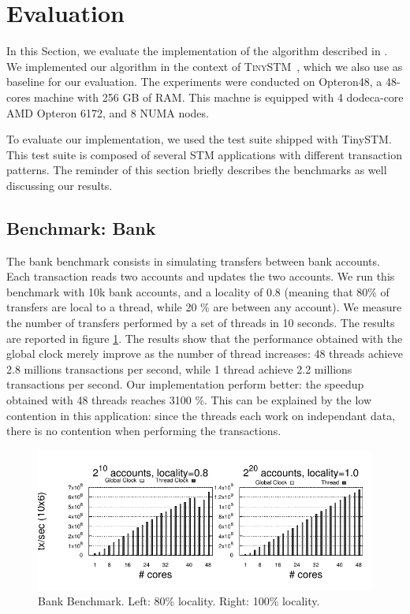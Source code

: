 \section{Evaluation}


In this Section, we evaluate the implementation of the algorithm
described in .  
We implemented our algorithm in the context of \textsc{TinySTM}~\cite{FelberFMR10}, which we also use as baseline for our evaluation. %
The experiments were conducted on Opteron48, a 48-cores machine with 256 GB of RAM. 
This machne is equipped with 4 dodeca-core AMD Opteron 6172, and 8 NUMA nodes.

To evaluate our implementation, we used the test suite shipped with TinySTM. 
This test suite is composed of several STM applications with different transaction patterns.
The reminder of this section briefly describes the benchmarks as well discussing our results.
 
\subsection{Benchmark: Bank}

The bank benchmark consists in simulating transfers between bank accounts. 
Each transaction reads two accounts and updates the two accounts. 
We run this benchmark with 10k bank accounts, and a locality
of 0.8 (meaning that 80\% of transfers are local to a thread, while 20
\% are between any account). 
We measure the number of transfers performed by a set of threads in 10 seconds.
The results are reported in figure \ref{fig:benchmarking:bank}.%
%
The results show that the performance obtained with the global clock
merely improve as the number of thread increases: 48 threads achieve 2.8
millions transactions per second, while 1 thread achieve 2.2 millions
transactions per second.
%
Our implementation perform better: the speedup obtained with 48
threads reaches 3100 \%. This can be explained by the low contention
in this application: since the threads each work on independant data,
there is no contention when performing the transactions.

\begin{figure}[!t]
	\centering
	\includegraphics[scale = 1.0]{results/intset/bank.pdf}
	\caption{Bank Benchmark. Left: 80\% locality. Right: 100\% locality.\label{fig:benchmarking:bank}}
\end{figure}

